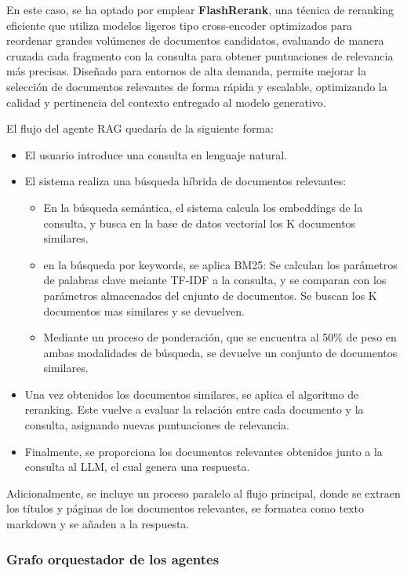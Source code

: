 \begin{itemize}
    En este caso, se ha optado por emplear \textbf{FlashRerank}, una técnica de reranking eficiente que utiliza modelos ligeros tipo cross-encoder optimizados para reordenar grandes volúmenes de documentos candidatos, evaluando de manera cruzada cada fragmento con la consulta para obtener puntuaciones de relevancia más precisas. 
    Diseñado para entornos de alta demanda, permite mejorar la selección de documentos relevantes de forma rápida y escalable, optimizando la calidad y pertinencia del contexto entregado al modelo generativo.
\end{itemize}

El flujo del agente RAG quedaría de la siguiente forma:
\begin{itemize}
    \item El usuario introduce una consulta en lenguaje natural.
    \item El sistema realiza una búsqueda híbrida de documentos relevantes:
    \begin{itemize}
        \item En la búsqueda semántica, el sistema calcula los embeddings de la consulta, y busca en la base de datos vectorial los K documentos similares.
        \item en la búsqueda por keywords, se aplica BM25: Se calculan los parámetros de palabras clave meiante TF-IDF a la consulta, y se comparan con los parámetros almacenados del cnjunto de documentos. Se buscan los K documentos mas similares y se devuelven.
        \item Mediante un proceso de ponderación, que se encuentra al 50\% de peso en ambas modalidades de búsqueda, se devuelve un conjunto de documentos similares.
    \end{itemize}
    \item Una vez obtenidos los documentos similares, se aplica el algoritmo de reranking. Este vuelve a evaluar la relación entre cada documento y la consulta, asignando nuevas puntuaciones de relevancia.
    \item Finalmente, se proporciona los documentos relevantes obtenidos junto a la consulta al LLM, el cual genera una respuesta.
\end{itemize}

Adicionalmente, se incluye un proceso paralelo al flujo principal, donde se extraen los títulos y páginas de los documentos relevantes, se formatea como texto markdown y se añaden a la respuesta.

\subsubsection{Grafo orquestador de los agentes}

